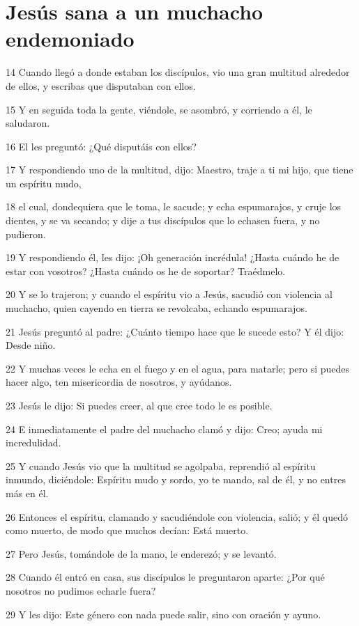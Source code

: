 \section*{Jesús sana a un muchacho endemoniado}

\par 14 Cuando llegó a donde estaban los discípulos, vio una gran multitud alrededor de ellos, y escribas que disputaban con ellos.
\par 15 Y en seguida toda la gente, viéndole, se asombró, y corriendo a él, le saludaron.
\par 16 El les preguntó: ¿Qué disputáis con ellos?
\par 17 Y respondiendo uno de la multitud, dijo: Maestro, traje a ti mi hijo, que tiene un espíritu mudo,
\par 18 el cual, dondequiera que le toma, le sacude; y echa espumarajos, y cruje los dientes, y se va secando; y dije a tus discípulos que lo echasen fuera, y no pudieron.
\par 19 Y respondiendo él, les dijo: ¡Oh generación incrédula! ¿Hasta cuándo he de estar con vosotros? ¿Hasta cuándo os he de soportar? Traédmelo.
\par 20 Y se lo trajeron; y cuando el espíritu vio a Jesús, sacudió con violencia al muchacho, quien cayendo en tierra se revolcaba, echando espumarajos.
\par 21 Jesús preguntó al padre: ¿Cuánto tiempo hace que le sucede esto? Y él dijo: Desde niño.
\par 22 Y muchas veces le echa en el fuego y en el agua, para matarle; pero si puedes hacer algo, ten misericordia de nosotros, y ayúdanos.
\par 23 Jesús le dijo: Si puedes creer, al que cree todo le es posible.
\par 24 E inmediatamente el padre del muchacho clamó y dijo: Creo; ayuda mi incredulidad.
\par 25 Y cuando Jesús vio que la multitud se agolpaba, reprendió al espíritu inmundo, diciéndole: Espíritu mudo y sordo, yo te mando, sal de él, y no entres más en él.
\par 26 Entonces el espíritu, clamando y sacudiéndole con violencia, salió; y él quedó como muerto, de modo que muchos decían: Está muerto.
\par 27 Pero Jesús, tomándole de la mano, le enderezó; y se levantó.
\par 28 Cuando él entró en casa, sus discípulos le preguntaron aparte: ¿Por qué nosotros no pudimos echarle fuera?
\par 29 Y les dijo: Este género con nada puede salir, sino con oración y ayuno.

